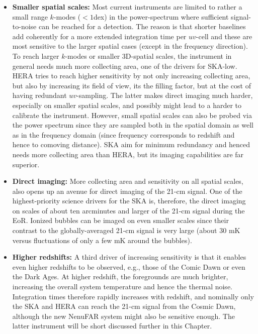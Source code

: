 \begin{itemize}
  
\item {\bf Smaller spatial scales:} Most current instruments are limited to rather a small range $k$-modes ($<1$dex) in the power-spectrum where sufficient signal-to-noise can be reached for a detection. The reason is that shorter baselines add coherently for a more extended integration time per $uv$-cell and these are most sensitive to the larger spatial cases (except in the frequency direction). To reach larger $k$-modes or smaller 3D-spatial scales, the instrument in general needs much more collecting area, one of the drivers for SKA-low. HERA tries to reach higher sensitivity by not only increasing collecting area, but also by increasing its field of view, its the filling factor, but at the cost of having redundant $uv$-sampling. The latter makes direct imaging much harder, especially on smaller spatial scales, and possibly might lead to a harder to calibrate the instrument. However, small spatial scales can also be probed via the power spectrum since they are sampled both in the spatial domain as well as in the frequency domain (since frequency corresponds to redshift and hence to comoving distance). SKA aim for minimum redundancy and henced needs 
more collecting area than HERA, but its imaging capabilities are far superior.
    
\item {\bf Direct imaging:} More collecting area and sensitivity on all spatial scales, also opens up an avenue for direct imaging of the 21-cm signal. One of the highest-priority science drivers for the SKA is, therefore, the direct imaging on scales of about ten arcminutes and larger of the 21-cm signal during the EoR. Ionized bubbles can be imaged on even smaller scales since their contrast to the globally-averaged 21-cm signal is very large (about 30 mK versus fluctuations of only a few mK around the bubbles). 

\item {\bf Higher redshifts:} A third driver of increasing sensitivity is that it enables even higher redshifts to be observed, e.g., those of the Comic Dawn or even the Dark Ages. At higher redshift, the foregrounds are much brighter, increasing the overall system temperature and hence the thermal noise. Integration times therefore rapidly increases with redshift, and nominally only the SKA and HERA can reach the 21-cm signal from the Cosmic Dawn, although the new NenuFAR system might also be sensitive enough. The latter instrument will be short discussed further in this Chapter.
\end{itemize}

